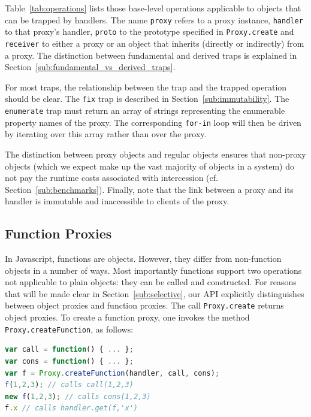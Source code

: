\documentclass{sig-alternate}
\begin{document}
Table~\ref{tab:operations} lists those base-level operations applicable to objects that can be trapped by handlers. The name \texttt{proxy} refers to a proxy instance, \texttt{handler} to that proxy's handler, \texttt{proto} to the prototype specified in \texttt{Proxy.create} and \texttt{receiver} to either a proxy or an object that inherits (directly or indirectly) from a proxy. The distinction between fundamental and derived traps is explained in Section~\ref{sub:fundamental_vs_derived_traps}.

For most traps, the relationship between the trap and the trapped operation should be clear. The \texttt{fix} trap is described in Section~\ref{sub:immutability}. The \texttt{enumerate} trap must return an array of strings representing the enumerable property names of the proxy. The corresponding \texttt{for-in} loop will then be driven by iterating over this array rather than over the proxy.

The distinction between proxy objects and regular objects ensures that non-proxy objects (which we expect make up the vast majority of objects in a system) do not pay the runtime costs associated with intercession (cf. Section~\ref{sub:benchmarks}). Finally, note that the link between a proxy and its handler is immutable and inaccessible to clients of the proxy.


\subsection{Function Proxies}
\label{sub:funproxies}

In Javascript, functions are objects. However, they differ from non-function objects in a number of ways. Most importantly functions support two operations not applicable to plain objects: they can be called and constructed. For reasons that will be made clear in Section~\ref{sub:selective}, our API explicitly distinguishes between object proxies and function proxies. The call \texttt{Proxy.create} returns object proxies. To create a function proxy, one invokes the method \texttt{Proxy.createFunction}, as follows:

\begin{lstlisting}[language=javascript]
var call = function() { ... };
var cons = function() { ... };
var f = Proxy.createFunction(handler, call, cons);
f(1,2,3); // calls call(1,2,3)
new f(1,2,3); // calls cons(1,2,3)
f.x // calls handler.get(f,'x')
\end{lstlisting}
\end{document}
